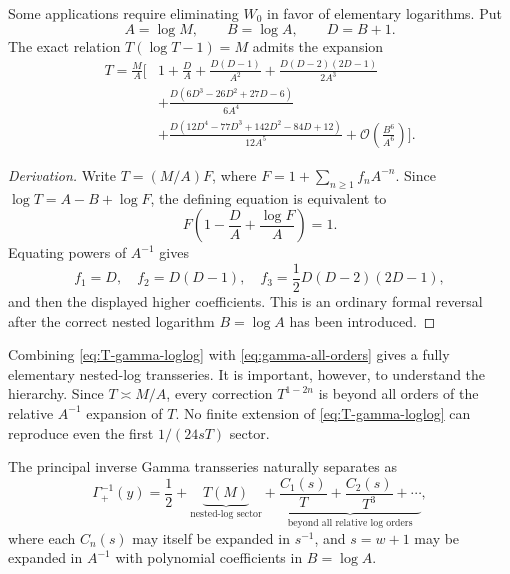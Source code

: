 \documentclass[11pt]{article}
\theoremstyle{definition}
\theoremstyle{remark}
\newcommand{\BigO}{\mathcal O}
\newcommand{\Gaminv}{\Gamma_{+}^{-1}}
\begin{document}
Some applications require eliminating \(W_0\) in favor of elementary logarithms.  Put
\begin{equation}\label{eq:gamma-log-vars}
 A=\log M,
 \qquad B=\log A,
 \qquad D=B+1.
\end{equation}
The exact relation \(T(\log T-1)=M\) admits the expansion
\begin{equation}\label{eq:T-gamma-loglog}
\begin{split}
 T=\frac{M}{A}\Bigg[&1+\frac{D}{A}
 +\frac{D(D-1)}{A^2}
 +\frac{D(D-2)(2D-1)}{2A^3}\\
 &+\frac{D(6D^3-26D^2+27D-6)}{6A^4}\\
 &+\frac{D(12D^4-77D^3+142D^2-84D+12)}{12A^5}
 +\BigO\!\left(\frac{B^6}{A^6}\right)\Bigg].
\end{split}
\end{equation}

\begin{proof}[Derivation]
Write \(T=(M/A)F\), where \(F=1+\sum_{n\ge1}f_nA^{-n}\).  Since
\(\log T=A-B+\log F\), the defining equation is equivalent to
\begin{equation}\label{eq:Fgamma}
 F\left(1-\frac{D}{A}+\frac{\log F}{A}\right)=1.
\end{equation}
Equating powers of \(A^{-1}\) gives
\[
 f_1=D,
 \quad f_2=D(D-1),
 \quad f_3=\frac12D(D-2)(2D-1),
\]
and then the displayed higher coefficients.  This is an ordinary formal reversal after the correct nested logarithm \(B=\log A\) has been introduced.
\end{proof}

Combining \cref{eq:T-gamma-loglog} with \cref{eq:gamma-all-orders} gives a fully elementary nested-log transseries.  It is important, however, to understand the hierarchy.  Since \(T\asymp M/A\), every correction \(T^{1-2n}\) is beyond all orders of the relative \(A^{-1}\) expansion of \(T\).  No finite extension of \cref{eq:T-gamma-loglog} can reproduce even the first \(1/(24sT)\) sector.

\begin{summarybox}
The principal inverse Gamma transseries naturally separates as
\[
 \Gaminv(y)
 =\frac12+
 \underbrace{T(M)}_{\text{nested-log sector}}
 +\underbrace{\frac{C_1(s)}{T}+\frac{C_2(s)}{T^3}+\cdots}_{\text{beyond all relative log orders}},
\]
where each \(C_n(s)\) may itself be expanded in \(s^{-1}\), and \(s=w+1\) may be expanded in \(A^{-1}\) with polynomial coefficients in \(B=\log A\).
\end{summarybox}
\end{document}
